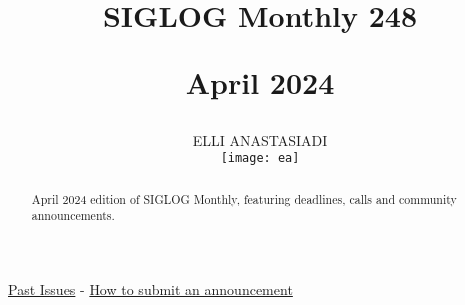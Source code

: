 \documentclass[prodmode,acmtecs]{acmsmall} %
\newcounter{colstart}
\begin{document}
\setcounter{colstart}{\thepage}

\title{{\huge\sc SIGLOG Monthly 248}

 April 2024}
\author{ELLI ANASTASIADI
\vspace*{-2.6cm}\begin{flushright}\texttt{[image: ea]}\end{flushright}
}


\begin{abstract}
April 2024 edition of SIGLOG Monthly, featuring deadlines, calls and community announcements.
\end{abstract}


\maketitlee

\href{https://lics.siglog.org/newsletters/}{Past Issues}
 - 
\href{https://lics.siglog.org/newsletters/inst.html}{How to submit an announcement}
\end{document}

